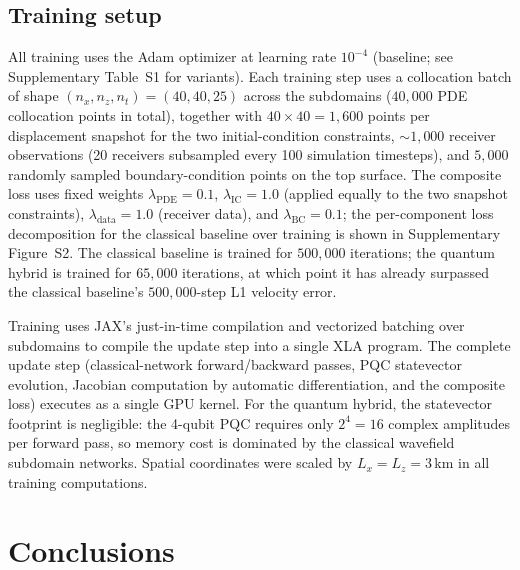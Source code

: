\documentclass[11pt,a4paper]{article}
\begin{document}
\subsection{Training setup}
\label{sec:methods_training}

All training uses the Adam optimizer at learning rate $10^{-4}$ (baseline; see Supplementary Table~S1 for variants). Each training step uses a collocation batch of shape $(n_x, n_z, n_t) = (40,40,25)$ across the subdomains ($40{,}000$ PDE collocation points in total), together with $40\!\times\!40 = 1{,}600$ points per displacement snapshot for the two initial-condition constraints, $\sim$$1{,}000$ receiver observations (20 receivers subsampled every 100 simulation timesteps), and $5{,}000$ randomly sampled boundary-condition points on the top surface. The composite loss uses fixed weights $\lambda_\text{PDE} = 0.1$, $\lambda_\text{IC} = 1.0$ (applied equally to the two snapshot constraints), $\lambda_\text{data} = 1.0$ (receiver data), and $\lambda_\text{BC} = 0.1$; the per-component loss decomposition for the classical baseline over training is shown in Supplementary Figure~S2. The classical baseline is trained for $500{,}000$ iterations; the quantum hybrid is trained for $65{,}000$ iterations, at which point it has already surpassed the classical baseline's $500{,}000$-step L1 velocity error.

Training uses JAX's just-in-time compilation and vectorized batching over subdomains to compile the update step into a single XLA program. The complete update step (classical-network forward/backward passes, PQC statevector evolution, Jacobian computation by automatic differentiation, and the composite loss) executes as a single GPU kernel. For the quantum hybrid, the statevector footprint is negligible: the 4-qubit PQC requires only $2^4 = 16$ complex amplitudes per forward pass, so memory cost is dominated by the classical wavefield subdomain networks. Spatial coordinates were scaled by $L_x = L_z = 3$\,km in all training computations.


\section{Conclusions}
\end{document}
